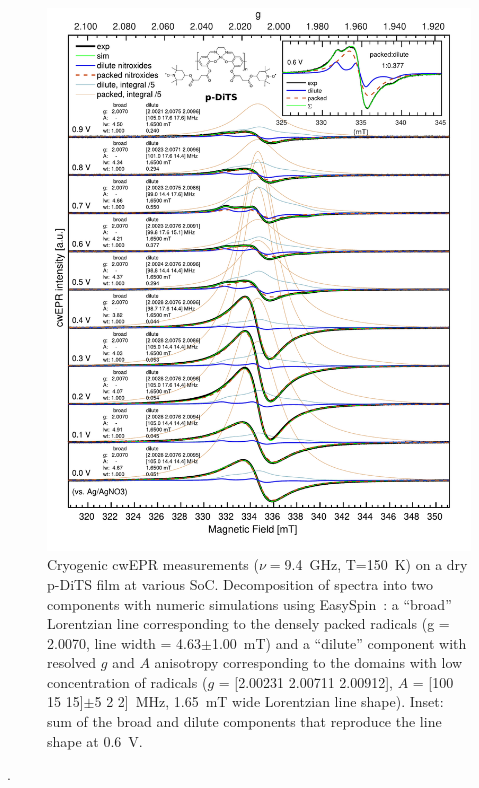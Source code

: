 \begin{figure}[]
\center
	\includegraphics[width=1\textwidth]{./operando_epr/figures/CRYO/Figure_S7_new.pdf}
	\caption{Cryogenic cwEPR measurements ($\nu=$9.4~GHz, T=150~K) on a dry p-DiTS film at various SoC. Decomposition of spectra into two components with numeric simulations using EasySpin~\cite{Stoll2006}: a ``broad'' Lorentzian line corresponding to the densely packed radicals (g = 2.0070, line width = 4.63$\pm$1.00~mT) and a ``dilute'' component with resolved $g$ and $A$ anisotropy corresponding to the domains with low concentration of radicals ($g$ = [2.00231 2.00711 2.00912], $A$ = [100 15 15]$\pm$5 2 2]~MHz, 1.65~mT wide Lorentzian line shape). Inset: sum of the broad and dilute components that reproduce the line shape at 0.6~V.\\}
	\label{fig:cwEPR_CRYO_DiTS_CHG_SIM}
\end{figure}
\newpage
\newpage
.


